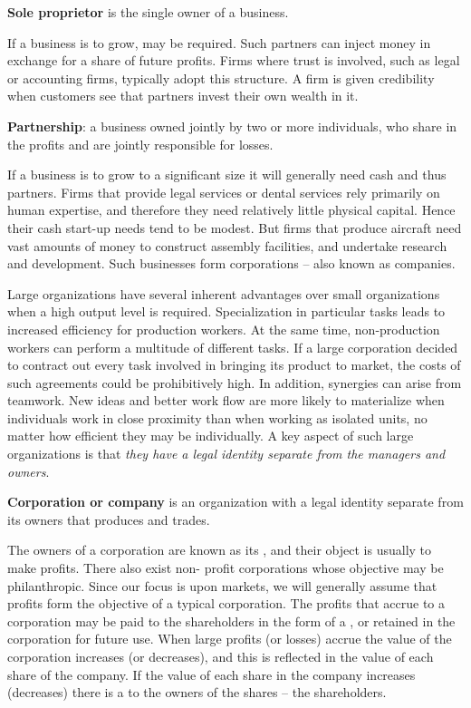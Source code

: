 \begin{DefBox}
\textbf{Sole proprietor} is the single owner of a business.
\end{DefBox}

If a business is to grow,  may be required. Such partners can inject money in exchange for a share of future profits. Firms where trust is involved, such as legal or accounting firms, typically adopt this structure. A firm is given credibility when customers see that partners invest their own wealth in it. 

\begin{DefBox}
\textbf{Partnership}: a business owned jointly by two or more individuals, who share in the profits and are jointly responsible for losses.
\end{DefBox}

If a business is to grow to a significant size it will generally need cash and thus partners. Firms that provide legal services or dental services rely primarily on human expertise, and therefore they need relatively little physical capital. Hence their cash start-up needs tend to be modest. But firms that produce aircraft need vast amounts of money to construct assembly facilities, and undertake research and development. Such businesses form corporations -- also known as companies. 

Large organizations have several inherent advantages over small organizations when a high output level is required. Specialization in particular tasks leads to increased efficiency for production workers. At the same time, non-production workers can perform a multitude of different tasks. If a large corporation decided to contract out every task involved in bringing its product to market, the costs of such agreements could be prohibitively high. In addition, synergies can arise from teamwork. New ideas and better work flow are more likely to materialize when individuals work in close proximity than when working as isolated units, no matter how efficient they may be individually. A key aspect of such large organizations is that \textit{they have a legal identity separate from the managers and owners}.

\begin{DefBox}
\textbf{Corporation or company} is an organization with a legal identity separate from its owners that produces and trades.
\end{DefBox}

The owners of a corporation are known as its , and their object is usually to make profits. There also exist non- profit corporations whose objective may be philanthropic. Since our focus is upon markets, we will generally assume that profits form the objective of a typical corporation. The profits that accrue to a corporation may be paid to the shareholders in the form of a , or retained in the corporation for future use. When large profits (or losses) accrue the value of the corporation increases (or decreases), and this is reflected in the value of each share of the company. If the value of each share in the company increases (decreases) there is a  to the owners of the shares -- the shareholders.

